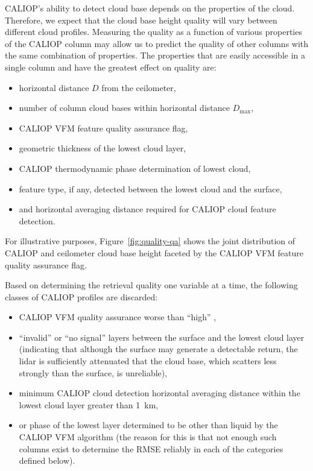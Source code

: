 \documentclass[amt,manuscript]{copernicus}\usepackage[]{graphicx}\usepackage[]{color}
\begin{document}
CALIOP's ability to detect cloud base depends on the properties of the cloud.
Therefore, we expect that the cloud base height quality will vary between
different cloud profiles.  Measuring the quality as a function of various
properties of the CALIOP column may allow us to predict the quality of other
columns with the same combination of properties.  The properties that are easily
accessible in a single column and have the greatest effect on quality are:
\begin{itemize}
\item horizontal distance $D$ from the ceilometer,
\item number of column cloud bases within horizontal distance $D_\text{max}$,
\item CALIOP VFM feature quality assurance flag,
\item geometric thickness of the lowest cloud layer,
\item CALIOP thermodynamic phase determination of lowest cloud,
\item feature type, if any, detected between the lowest cloud and the surface,
\item and horizontal averaging distance required for CALIOP cloud feature
  detection.
\end{itemize}
For illustrative purposes, Figure~\ref{fig:quality-qa} shows the joint
distribution of CALIOP and ceilometer cloud base height faceted by the CALIOP
VFM feature quality assurance flag.  

Based on determining the retrieval quality one variable at a time, the following
classes of CALIOP profiles are discarded:
\begin{itemize}
\item CALIOP VFM quality assurance worse than ``high'' ,
\item ``invalid'' or ``no signal'' layers between the surface and the lowest
  cloud layer (indicating that although the surface may generate a detectable
  return, the lidar is sufficiently attenuated that the cloud base, which
  scatters less strongly than the surface, is unreliable),
\item minimum CALIOP cloud detection horizontal averaging distance within the
  lowest cloud layer greater than 1~km,
\item or phase of the lowest layer determined to be other than liquid by the
  CALIOP VFM algorithm (the reason for this is that not enough such columns
  exist to determine the RMSE reliably in each of the categories defined below).
\end{itemize}
\end{document}
